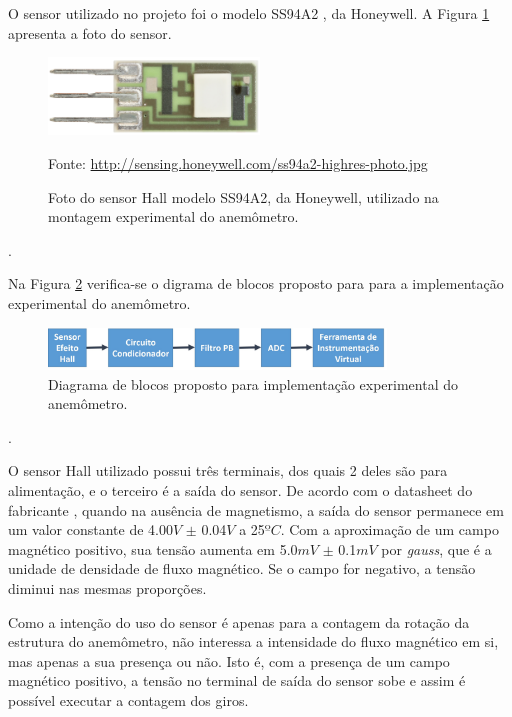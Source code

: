 \documentclass[a4paper]{instrumentacao}
\begin{document}
O sensor utilizado no projeto foi o modelo SS94A2 \cite{datasheet-hall}, da Honeywell. A Figura \ref{fig:anemometro-hall-foto} apresenta a foto do sensor.

\begin{figure}[H]
	\centering \includegraphics[width=0.5\textwidth]{sensor-hall-foto.jpg}
	\caption{Foto do sensor Hall modelo SS94A2, da Honeywell, utilizado na montagem experimental do anemômetro.}
	Fonte:  \url{http://sensing.honeywell.com/ss94a2-highres-photo.jpg}
	\label{fig:anemometro-hall-foto}
\end{figure}.

Na Figura \ref{fig:anemometro-bloco-experimental} verifica-se o digrama de blocos proposto para para a implementação experimental do anemômetro.

\begin{figure}[H]
	\centering \includegraphics[width=0.8\textwidth]{anemometro-fluxograma.jpg}
	\caption{Diagrama de blocos proposto para implementação experimental do anemômetro.}
	\label{fig:anemometro-bloco-experimental}
\end{figure}.

O sensor Hall utilizado possui três terminais, dos quais 2 deles são para alimentação, e o terceiro é a saída do sensor. De acordo com o datasheet do fabricante \cite{datasheet-hall}, quando na ausência de magnetismo, a saída do sensor permanece em um valor constante de 4.00$V$ $\pm$ 0.04$V$ a 25$ºC$. Com a aproximação de um campo magnético positivo, sua tensão aumenta em 5.0$mV$ $\pm$ 0.1$mV$ por \textit{gauss}, que é a unidade de densidade de fluxo magnético. Se o campo for negativo, a tensão diminui nas mesmas proporções.

Como a intenção do uso do sensor é apenas para a contagem da rotação da estrutura do anemômetro, não interessa a intensidade do fluxo magnético em si, mas apenas a sua presença ou não. Isto é, com a presença de um campo magnético positivo, a tensão no terminal de saída do sensor sobe e assim é possível executar a contagem dos giros.
\end{document}
